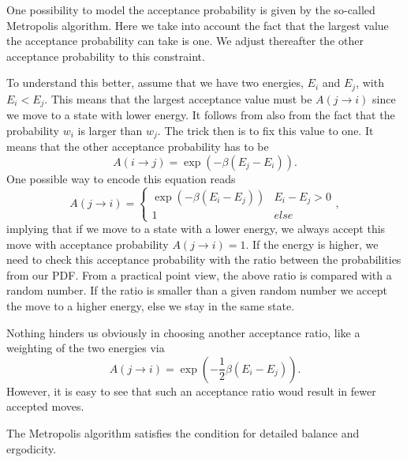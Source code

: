 One possibility to model the acceptance probability 
is given by the so-called Metropolis algorithm. 
Here we take into account the fact that the largest value the acceptance probability can take is one. We adjust thereafter the other acceptance probability
to this constraint. 

To understand this better, assume that we have two energies, $E_i$ and $E_j$, with $E_i < E_j$. This means that the largest acceptance value must be 
$A(j\rightarrow i)$ since we move to a state with lower energy.  It follows from also from the fact that the probability $w_i$ is larger than $w_j$. 
The trick then is to fix this value to one. It means that 
the other acceptance probability has to be 
\[
A(i\rightarrow j)= \exp{(-\beta(E_j-E_i))}.
\]
One possible way to encode this equation reads
\[       
A(j\rightarrow i)=\left\{\begin{array}{cc}
\exp{(-\beta(E_i-E_j))} & E_i-E_j > 0 \\ 1 & else \end{array} \right.,  
\]
implying that if we move to a state with a lower energy, we always accept
this move with acceptance probability $A(j\rightarrow i)=1$. If the energy is higher, we need to check
this acceptance probability with the ratio between the probabilities  from our PDF.  From a practical point view, the above ratio is compared with a random number.
If the ratio is smaller than a given random number we accept the move to a higher energy, else we stay in the same state. 

Nothing hinders us obviously in choosing another acceptance ratio, like a weighting  of the two energies via
\[
A(j\rightarrow i)=\exp{(-\frac{1}{2}\beta(E_i-E_j))}.
\]
However, it is easy to see that such an acceptance ratio woud result in 
fewer accepted moves.

The Metropolis 
algorithm satisfies the condition for detailed balance and ergodicity.

